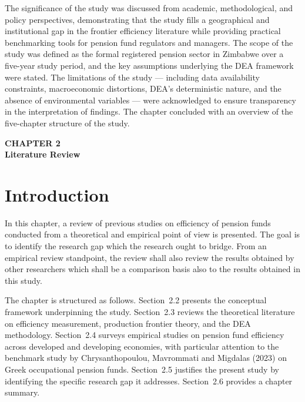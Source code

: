 \documentclass[12pt,a4paper]{article}
\begin{document}
The significance of the study was discussed from academic, methodological, and policy perspectives, demonstrating that the study fills a geographical and institutional gap in the frontier efficiency literature while providing practical benchmarking tools for pension fund regulators and managers. The scope of the study was defined as the formal registered pension sector in Zimbabwe over a five-year study period, and the key assumptions underlying the DEA framework were stated. The limitations of the study --- including data availability constraints, macroeconomic distortions, DEA's deterministic nature, and the absence of environmental variables --- were acknowledged to ensure transparency in the interpretation of findings. The chapter concluded with an overview of the five-chapter structure of the study.

\newpage

\begin{center}
    {\LARGE\bfseries CHAPTER 2}\\[0.5cm]
    {\Large\bfseries Literature Review}
\end{center}
\setcounter{section}{0}
\renewcommand{\thesection}{2.\arabic{section}}
{}

\vspace{1cm}

\section{Introduction}

In this chapter, a review of previous studies on efficiency of pension funds conducted from a theoretical and empirical point of view is presented. The goal is to identify the research gap which the research ought to bridge. From an empirical review standpoint, the review shall also review the results obtained by other researchers which shall be a comparison basis also to the results obtained in this study.

The chapter is structured as follows. Section~2.2 presents the conceptual framework underpinning the study. Section~2.3 reviews the theoretical literature on efficiency measurement, production frontier theory, and the DEA methodology. Section~2.4 surveys empirical studies on pension fund efficiency across developed and developing economies, with particular attention to the benchmark study by Chrysanthopoulou, Mavrommati and Migdalas (2023) on Greek occupational pension funds. Section~2.5 justifies the present study by identifying the specific research gap it addresses. Section~2.6 provides a chapter summary.
\end{document}
